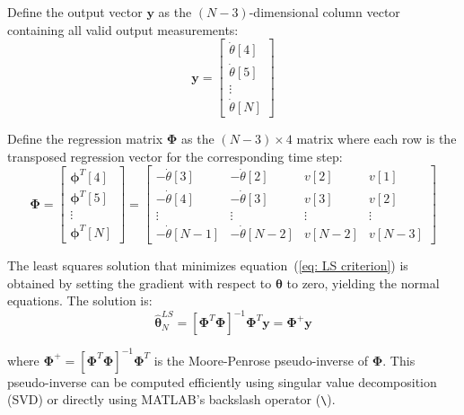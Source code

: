\documentclass{article}
\begin{document}
	Define the output vector $\boldsymbol{y}$ as the $(N-3)$-dimensional column vector containing all valid output measurements:
	\begin{equation}
		\boldsymbol{y} = \begin{bmatrix}
			\dot{\theta}[4] \\ \dot{\theta}[5] \\ \vdots \\ \dot{\theta}[N]
		\end{bmatrix}
	\end{equation}
	
	Define the regression matrix $\boldsymbol{\Phi}$ as the $(N-3) \times 4$ matrix where each row is the transposed regression vector for the corresponding time step:
	\begin{equation}
		\boldsymbol{\Phi} = \begin{bmatrix}
			\boldsymbol{\phi}^T[4] \\
			\boldsymbol{\phi}^T[5] \\
			\vdots \\
			\boldsymbol{\phi}^T[N]
		\end{bmatrix} = \begin{bmatrix}
			-\dot{\theta}[3] & -\dot{\theta}[2] & v[2] & v[1] \\
			-\dot{\theta}[4] & -\dot{\theta}[3] & v[3] & v[2] \\
			\vdots & \vdots & \vdots & \vdots \\
			-\dot{\theta}[N-1] & -\dot{\theta}[N-2] & v[N-2] & v[N-3]
		\end{bmatrix}
	\end{equation}
	
	The least squares solution that minimizes equation~(\ref{eq: LS criterion}) is obtained by setting the gradient with respect to $\boldsymbol{\theta}$ to zero, yielding the normal equations. The solution is:
	\begin{equation}
		\hat{\boldsymbol{\theta}}^{LS}_N = [\boldsymbol{\Phi}^T \boldsymbol{\Phi}]^{-1} \boldsymbol{\Phi}^T \boldsymbol{y} = \boldsymbol{\Phi}^+ \boldsymbol{y}
		\label{eq: LS solution}
	\end{equation}
	
	where $\boldsymbol{\Phi}^+ = [\boldsymbol{\Phi}^T \boldsymbol{\Phi}]^{-1} \boldsymbol{\Phi}^T$ is the Moore-Penrose pseudo-inverse of $\boldsymbol{\Phi}$. This pseudo-inverse can be computed efficiently using singular value decomposition (SVD) or directly using MATLAB's backslash operator (\texttt{\textbackslash}).
	
\end{document}
